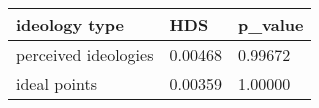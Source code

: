 \begin{table}
\centering
\begin{tabular}[t]{lll}
\toprule
ideology type & HDS & p\_value\\
\midrule
perceived ideologies & 0.00468 & 0.99672\\
ideal points & 0.00359 & 1.00000\\
\bottomrule
\end{tabular}
\end{table}
